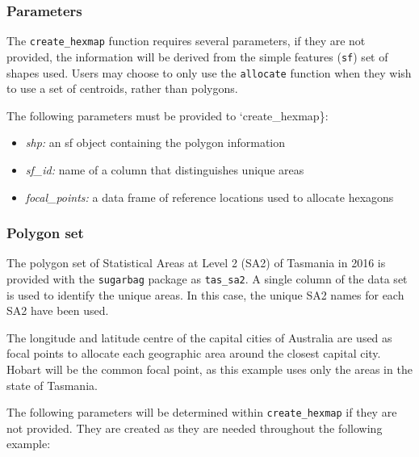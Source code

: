 \documentclass{monashthesis}
\begin{document}
\hypertarget{parameters}{%
\subsubsection{Parameters}\label{parameters}}

The \texttt{create\_hexmap} function requires several parameters, if they are not provided, the information will be derived from the simple features (\texttt{sf}) set of shapes used. Users may choose to only use the \texttt{allocate} function when they wish to use a set of centroids, rather than \autocite{sf} polygons.

The following parameters must be provided to `create\_hexmap\}:

\begin{itemize}
\tightlist
\item
  \emph{shp:} an sf object containing the polygon information
\item
  \emph{sf\_id:} name of a column that distinguishes unique areas
\item
  \emph{focal\_points:} a data frame of reference locations used to allocate hexagons
\end{itemize}

\hypertarget{polygon-set}{%
\subsubsection{Polygon set}\label{polygon-set}}

The polygon set of Statistical Areas at Level 2 (SA2) \autocite{abs2016} of Tasmania in 2016 is provided with the \texttt{sugarbag} package as \texttt{tas\_sa2}.
A single column of the data set is used to identify the unique areas.
In this case, the unique SA2 names for each SA2 have been used.

The longitude and latitude centre of the capital cities of Australia are used as focal points to allocate each geographic area around the closest capital city. Hobart will be the common focal point, as this example uses only the areas in the state of Tasmania.

\begin{Shaded}
\begin{Highlighting}[]
\end{Highlighting}
\end{Shaded}

The following parameters will be determined within \texttt{create\_hexmap} if they are not provided. They are created as they are needed throughout the following example:
\end{document}
